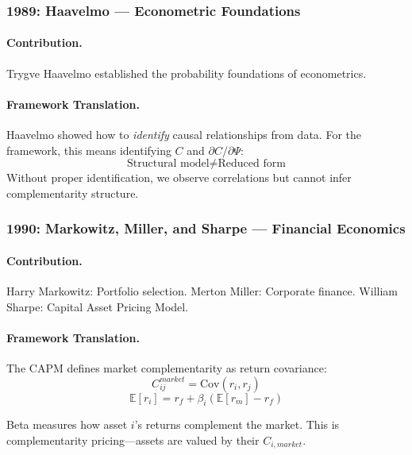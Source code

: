 \documentclass[12pt,a4paper]{article}
\begin{document}
\subsubsection{1989: Haavelmo --- Econometric Foundations}

\paragraph{Contribution.}
Trygve Haavelmo established the probability foundations of econometrics.

\paragraph{Framework Translation.}
Haavelmo showed how to \emph{identify} causal relationships from data.
For the framework, this means identifying $C$ and $\partial C / \partial \Psi$:
\begin{equation}
  \text{Structural model} \neq \text{Reduced form}
\end{equation}
Without proper identification, we observe correlations but cannot
infer complementarity structure.

\subsubsection{1990: Markowitz, Miller, and Sharpe --- Financial Economics}

\paragraph{Contribution.}
Harry Markowitz: Portfolio selection.
Merton Miller: Corporate finance.
William Sharpe: Capital Asset Pricing Model.

\paragraph{Framework Translation.}
The CAPM defines market complementarity as return covariance:
\begin{equation}
  C^{market}_{ij} = \text{Cov}(r_i, r_j)
\end{equation}
\begin{equation}
  \mathbb{E}[r_i] = r_f + \beta_i (\mathbb{E}[r_m] - r_f)
\end{equation}

Beta measures how asset $i$'s returns complement the market.
This is complementarity pricing---assets are valued by their $C_{i,market}$.
\end{document}
